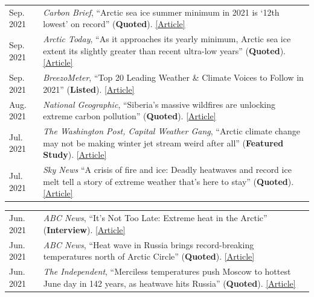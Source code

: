 \documentclass[margin,line,palatino,courier,10pt]{res}
\begin{document}
\begin{resume}
\begin{tabular}{@{}p{0.9in}p{4in}}
Sep. 2021 & \textit{Carbon Brief}, ``Arctic sea ice summer minimum in 2021 is `12th lowest' on record'' (\textbf{Quoted}). \href{https://www.carbonbrief.org/arctic-sea-ice-summer-minimum-in-2021-is-12th-lowest-on-record}{[Article]}\\
Sep. 2021 & \textit{Arctic Today}, ``As it approaches its yearly minimum, Arctic sea ice extent its slightly greater than recent ultra-low years'' (\textbf{Quoted}). \href{https://www.arctictoday.com/as-it-approaches-its-yearly-minimum-arctic-sea-ice-extent-its-slightly-greater-than-recent-ultra-low-years/}{[Article]}\\
Sep. 2021 & \textit{BreezoMeter}, ``Top 20 Leading Weather \& Climate Voices to Follow in 2021'' (\textbf{Listed}). \href{https://blog.breezometer.com/leading-weather-climate-voices-to-follow}{[Article]}\\
Aug. 2021 & \textit{National Geographic}, ``Siberia’s massive wildfires are unlocking extreme carbon pollution'' (\textbf{Quoted}). \href{https://www.nationalgeographic.com/environment/article/siberias-massive-wildfires-are-unlocking-extreme-carbon-pollution}{[Article]}\\
Jul. 2021 & \textit{The Washington Post, Capital Weather Gang}, ``Arctic climate change may not be making winter jet stream weird after all'' (\textbf{Featured Study}). \href{https://www.washingtonpost.com/weather/2021/07/31/arctic-climate-change-jetstream-winter/}{[Article]}\\
Jul. 2021 & \textit{Sky News} ``A crisis of fire and ice: Deadly heatwaves and record ice melt tell a story of extreme weather that’s here to stay'' (\textbf{Quoted}). \href{https://news.sky.com/story/climate-change-as-fire-rages-across-the-us-and-canada-ice-retreats-off-the-coast-of-siberia-12359277}{[Article]}\\
\end{tabular}
\begin{tabular}{@{}p{0.9in}p{4in}}
Jun. 2021 & \textit{ABC News}, ``It’s Not Too Late: Extreme heat in the Arctic'' (\textbf{Interview}). \href{https://abcnews.go.com/International/video/late-extreme-heat-arctic-78501037}{[Article]}\\
Jun. 2021 & \textit{ABC News}, ``Heat wave in Russia brings record-breaking temperatures north of Arctic Circle'' (\textbf{Quoted}). \href{https://abcnews.go.com/International/heat-wave-russia-brings-record-breaking-temperatures-north/story?id=78446355}{[Article]}\\
Jun. 2021 & \textit{The Independent}, ``Merciless temperatures push Moscow to hottest June day in 142 years, as heatwave hits Russia'' (\textbf{Quoted}). \href{https://www.independent.co.uk/climate-change/news/moscow-record-temperature-arctic-heatwave-b1871351.html}{[Article]}\\

\end{tabular}
\end{resume}
\end{document}
